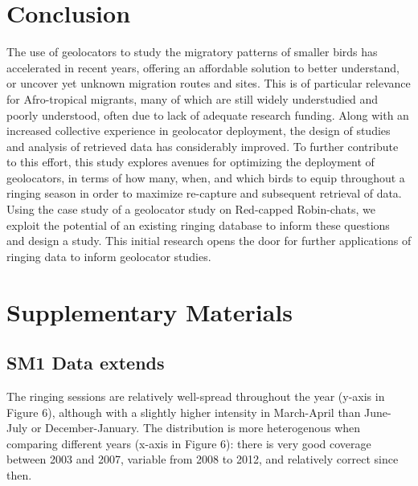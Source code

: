 \documentclass[]{interact}
\theoremstyle{plain}%
\theoremstyle{definition}
\theoremstyle{remark}
\begin{document}
\hypertarget{conclusion}{%
\section{Conclusion}\label{conclusion}}

The use of geolocators to study the migratory patterns of smaller birds
has accelerated in recent years, offering an affordable solution to
better understand, or uncover yet unknown migration routes and sites.
This is of particular relevance for Afro-tropical migrants, many of
which are still widely understudied and poorly understood, often due to
lack of adequate research funding. Along with an increased collective
experience in geolocator deployment, the design of studies and analysis
of retrieved data has considerably improved. To further contribute to
this effort, this study explores avenues for optimizing the deployment
of geolocators, in terms of how many, when, and which birds to equip
throughout a ringing season in order to maximize re-capture and
subsequent retrieval of data. Using the case study of a geolocator study
on Red-capped Robin-chats, we exploit the potential of an existing
ringing database to inform these questions and design a study. This
initial research opens the door for further applications of ringing data
to inform geolocator studies.

\hypertarget{supplementary-materials}{%
\section{Supplementary Materials}\label{supplementary-materials}}

\hypertarget{sm1-data-extends}{%
\subsection{SM1 Data extends}\label{sm1-data-extends}}

The ringing sessions are relatively well-spread throughout the year
(y-axis in Figure 6), although with a slightly higher intensity in
March-April than June-July or December-January. The distribution is more
heterogenous when comparing different years (x-axis in Figure 6): there
is very good coverage between 2003 and 2007, variable from 2008 to 2012,
and relatively correct since then.
\end{document}
